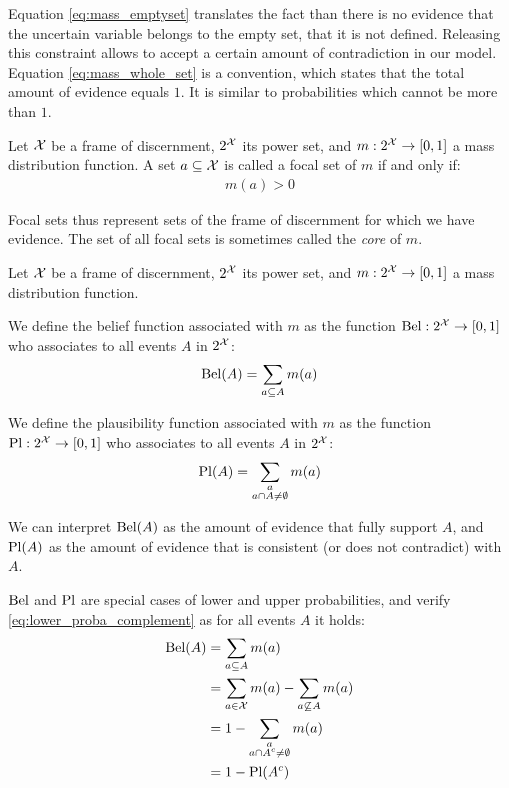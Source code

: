 \begin{remark}
    Equation \eqref{eq:mass_emptyset} translates the fact than there is no evidence that the uncertain variable belongs to the empty set, \ie that it is not defined. Releasing this constraint allows to accept a certain amount of contradiction in our model.
    Equation \eqref{eq:mass_whole_set} is a convention, which states that the total amount of evidence equals $1$. It is similar to probabilities which cannot be more than $1$. 
\end{remark}

\begin{definition}\label{def:focal_set}
    Let ${\mathcal{X}}$ be a frame of discernment, $2^{\mathcal{X}}$ its power set, and $m:2^{\mathcal{X}}\rightarrow[0,1]$ a mass distribution function. A set $a\subseteq{\mathcal{X}}$ is called a focal set of $m$ if and only if:
    \begin{align}
        m(a)>0\label{eq:focal_set}
    \end{align}
\end{definition}
Focal sets thus represent sets of the frame of discernment for which we have evidence. The set of all focal sets is sometimes called the \textit{core} of $m$.

\begin{definition}\label{def:belief_plausibility}
    Let ${\mathcal{X}}$ be a frame of discernment, $2^{\mathcal{X}}$ its power set, and $m:2^{\mathcal{X}}\rightarrow[0,1]$ a mass distribution function.
    
    We define the belief function associated with $m$ as the function ${\mathrm{Bel}}:2^{\mathcal{X}}\rightarrow[0,1]$ who associates to all events $A$ in $2^{\mathcal{X}}$:
    \begin{align*}
        {\mathrm{Bel}}(A)=\sum_{a\subseteq A} m(a)
    \end{align*}
    
    We define the plausibility function associated with $m$ as the function ${\mathrm{Pl}} :2^{\mathcal{X}}\rightarrow[0,1]$ who associates to all events $A$ in $2^{\mathcal{X}}$:
    \begin{align*}
        {\mathrm{Pl}}(A)=\sum_{\substack{a\\a\cap A\neq\emptyset}} m(a)
    \end{align*}
\end{definition}
We can interpret ${\mathrm{Bel}}(A)$ as the amount of evidence that fully support $A$, and ${\mathrm{Pl}}(A)$ as the amount of evidence that is consistent (or does not contradict) with $A$.

${\mathrm{Bel}}$ and ${\mathrm{Pl}}$ are special cases of lower and upper probabilities, and verify \eqref{eq:lower_proba_complement} as for all events $A$ it holds:
\begin{align*}
    {\mathrm{Bel}}(A)&=\sum_{a\subseteq A} m(a)\\
    &= \sum_{a\in {\mathcal{X}}} m(a) - \sum_{a\not\subseteq A} m(a)\\
    &= 1 - \sum_{\substack{a\\a\cap A^c\neq\emptyset}} m(a)\\
    &=1-{\mathrm{Pl}}(A^c)
\end{align*}


